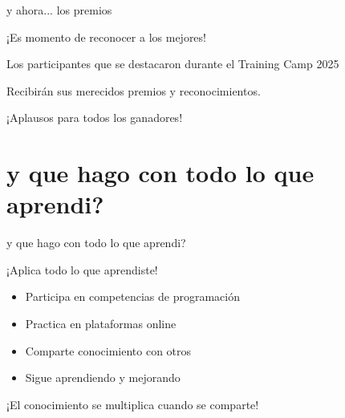 \documentclass{beamer}
\begin{document}
\begin{frame}{y ahora... los premios}
\begin{center}
\Large
¡Es momento de reconocer a los mejores!

\vspace{1cm}

Los participantes que se destacaron durante el Training Camp 2025

\vspace{1cm}

Recibirán sus merecidos premios y reconocimientos.

\vspace{1cm}

¡Aplausos para todos los ganadores!
\end{center}
\end{frame}


\section{y que hago con todo lo que aprendi?}

\begin{frame}{y que hago con todo lo que aprendi?}
\begin{center}
\Large
¡Aplica todo lo que aprendiste!

\vspace{1cm}

\begin{itemize}
\item Participa en competencias de programación
\item Practica en plataformas online
\item Comparte conocimiento con otros
\item Sigue aprendiendo y mejorando
\end{itemize}

\vspace{1cm}

¡El conocimiento se multiplica cuando se comparte!
\end{center}
\end{frame}
\end{document}
